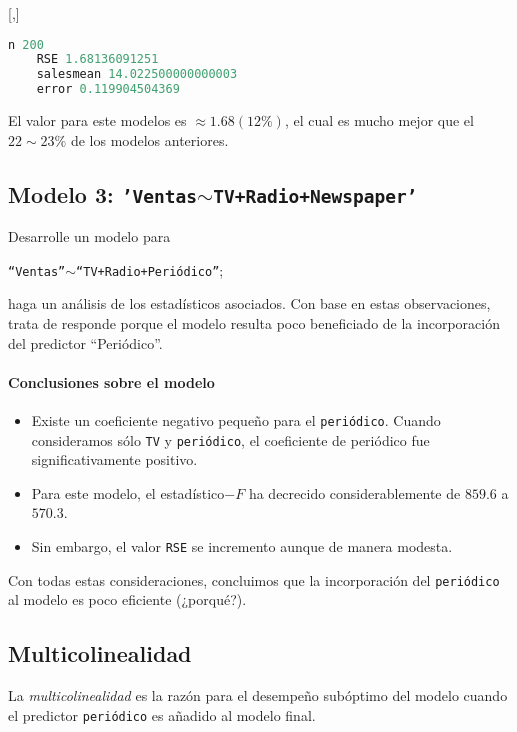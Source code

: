 [,]{}
\begin{lstlisting}[language=Python]
	n 200
	RSE 1.68136091251
	salesmean 14.022500000000003
	error 0.119904504369
\end{lstlisting}


El valor para este modelos es $\approx 1.68 (12\%)$, el cual es mucho mejor que el $22\sim23\%$ de los modelos anteriores.

\subsection{Modelo 3: \texttt{'Ventas$\sim$TV+Radio+Newspaper'}}

\begin{problema}
	Desarrolle un modelo para
	\begin{center}
		\texttt{``Ventas''$\sim$``TV+Radio+Periódico''};
	\end{center}
	haga un análisis de los estadísticos asociados.  Con base en estas observaciones, trata de responde porque el modelo resulta poco beneficiado de la incorporación del predictor ``Periódico''.
\end{problema}


\paragraph{Conclusiones sobre el modelo}
\begin{itemize}
	\item Existe un coeficiente negativo pequeño para el \texttt{periódico}.  Cuando consideramos sólo \texttt{TV} y \texttt{periódico}, el coeficiente de periódico fue significativamente positivo. 
	\item Para este modelo, el estadístico$-F$ ha decrecido considerablemente de $859.6$ a $570.3$. 
	\item Sin embargo, el valor \texttt{RSE} se incremento aunque de manera modesta. 
\end{itemize}
Con todas estas consideraciones, concluimos que la incorporación del \texttt{periódico} al modelo es poco eficiente (¿porqué?).

\subsection{Multicolinealidad}

La \emph{multicolinealidad} es la razón para el desempeño subóptimo del modelo cuando el predictor \texttt{periódico} es añadido al modelo final.

